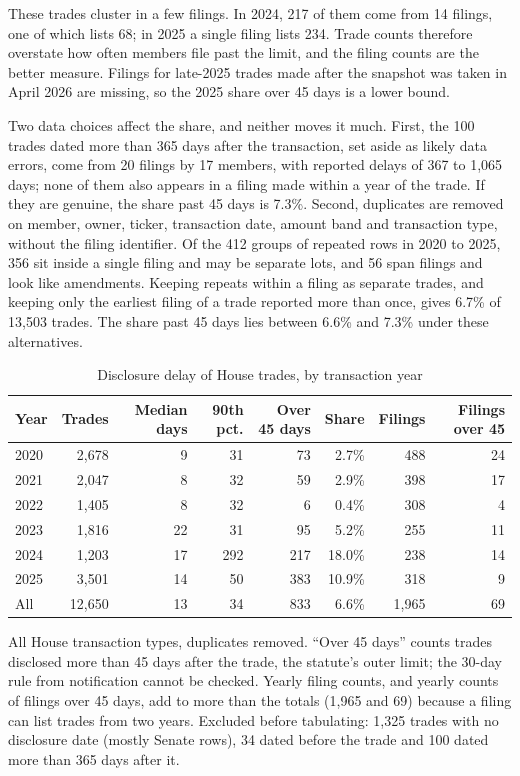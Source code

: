 \documentclass[11pt]{article}
\begin{document}
These trades cluster in a few filings. In 2024, 217 of them come from 14 filings, one of which lists 68; in 2025 a single filing lists 234. Trade counts therefore overstate how often members file past the limit, and the filing counts are the better measure. Filings for late-2025 trades made after the snapshot was taken in April 2026 are missing, so the 2025 share over 45 days is a lower bound.

Two data choices affect the share, and neither moves it much. First, the 100 trades dated more than 365 days after the transaction, set aside as likely data errors, come from 20 filings by 17 members, with reported delays of 367 to 1,065 days; none of them also appears in a filing made within a year of the trade. If they are genuine, the share past 45 days is 7.3\%. Second, duplicates are removed on member, owner, ticker, transaction date, amount band and transaction type, without the filing identifier. Of the 412 groups of repeated rows in 2020 to 2025, 356 sit inside a single filing and may be separate lots, and 56 span filings and look like amendments. Keeping repeats within a filing as separate trades, and keeping only the earliest filing of a trade reported more than once, gives 6.7\% of 13,503 trades. The share past 45 days lies between 6.6\% and 7.3\% under these alternatives.

\begin{table}[t]
\centering
\caption{Disclosure delay of House trades, by transaction year}\label{tab:lag}
\begin{tabular}{lrrrrrrr}
\toprule
Year & Trades & Median days & 90th pct. & Over 45 days & Share & Filings & Filings over 45 \\
\midrule
2020 & 2,678 & 9 & 31 & 73 & 2.7\% & 488 & 24 \\
2021 & 2,047 & 8 & 32 & 59 & 2.9\% & 398 & 17 \\
2022 & 1,405 & 8 & 32 & 6 & 0.4\% & 308 & 4 \\
2023 & 1,816 & 22 & 31 & 95 & 5.2\% & 255 & 11 \\
2024 & 1,203 & 17 & 292 & 217 & 18.0\% & 238 & 14 \\
2025 & 3,501 & 14 & 50 & 383 & 10.9\% & 318 & 9 \\
All & 12,650 & 13 & 34 & 833 & 6.6\% & 1,965 & 69 \\
\bottomrule
\end{tabular}

\smallskip
\parbox{0.92\linewidth}{\footnotesize All House transaction types, duplicates removed. ``Over 45 days'' counts trades disclosed more than 45 days after the trade, the statute's outer limit; the 30-day rule from notification cannot be checked. Yearly filing counts, and yearly counts of filings over 45 days, add to more than the totals (1,965 and 69) because a filing can list trades from two years. Excluded before tabulating: 1,325 trades with no disclosure date (mostly Senate rows), 34 dated before the trade and 100 dated more than 365 days after it.}
\end{table}
\end{document}
